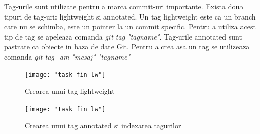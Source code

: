 \begin{itemize}
Tag-urile sunt utilizate pentru a marca commit-uri importante. Exista doua tipuri de tag-uri: lightweight si annotated. Un tag lightweight este ca un branch care nu se schimba, este un pointer la un commit specific. Pentru a utiliza acest tip de tag se apeleaza comanda \textit{git tag "tagname"}. Tag-urile annotated sunt pastrate ca obiecte in baza de date Git. Pentru a crea asa un tag se utilizeaza comanda \textit{git tag -am "mesaj" "tagname"}

\begin{figure}[h!]
			\centering
 			 \texttt{[image: "task fin lw"]}
 			 \caption{Crearea unui tag lightweight}
 			 \label{fig:solved}
		\end{figure}

\begin{figure}[h!]
			\centering
 			 \texttt{[image: "task fin lw"]}
 			 \caption{Crearea unui tag annotated si indexarea tagurilor}
 			 \label{fig:solved}
		\end{figure}

\end{itemize}

